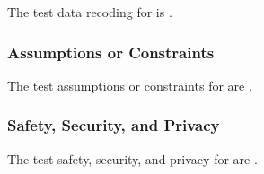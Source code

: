 The test data recoding for \TestIdName\xspace is \TBD.

\subsubsection{Assumptions or Constraints}
\label{loc:TestAssumptionsOrConstraints\TestIdName}

The test assumptions or constraints for \TestIdName\xspace are \TBD.

\subsubsection{Safety, Security, and Privacy}
\label{loc:TestSafetySecurityPrivacy\TestIdName}

The test safety, security, and privacy for \TestIdName\xspace are \TBD.
